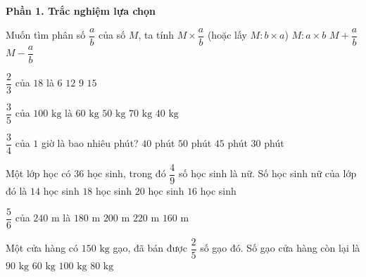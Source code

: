 \textbf{Phần 1. Trắc nghiệm lựa chọn}

\begin{ex} %
Muốn tìm phân số $\dfrac{a}{b}$ của số $M$, ta tính
\choice
{\True $M \times \dfrac{a}{b}$ (hoặc lấy $M : b \times a$)}
{$M : a \times b$}
{$M + \dfrac{a}{b}$}
{$M - \dfrac{a}{b}$}
\end{ex}

\begin{ex} %
$\dfrac{2}{3}$ của $18$ là
\choice
{$6$}
{\True $12$}
{$9$}
{$15$}
\end{ex}

\begin{ex} %
$\dfrac{3}{5}$ của $100\text{ kg}$ là
\choice
{\True $60\text{ kg}$}
{$50\text{ kg}$}
{$70\text{ kg}$}
{$40\text{ kg}$}
\end{ex}

\begin{ex} %
$\dfrac{3}{4}$ của $1$ giờ là bao nhiêu phút?
\choice
{$40$ phút}
{$50$ phút}
{\True $45$ phút}
{$30$ phút}
\end{ex}

\begin{ex} %
Một lớp học có 36 học sinh, trong đó $\dfrac{4}{9}$ số học sinh là nữ. Số học sinh nữ của lớp đó là
\choice
{$14$ học sinh}
{$18$ học sinh}
{$20$ học sinh}
{\True $16$ học sinh}
\end{ex}

\begin{ex} %
$\dfrac{5}{6}$ của $240\text{ m}$ là
\choice
{$180\text{ m}$}
{\True $200\text{ m}$}
{$220\text{ m}$}
{$160\text{ m}$}
\end{ex}

\begin{ex} %
Một cửa hàng có $150\text{ kg}$ gạo, đã bán được $\dfrac{2}{5}$ số gạo đó. Số gạo cửa hàng còn lại là
\choice
{\True $90\text{ kg}$}
{$60\text{ kg}$}
{$100\text{ kg}$}
{$80\text{ kg}$}
\end{ex}

